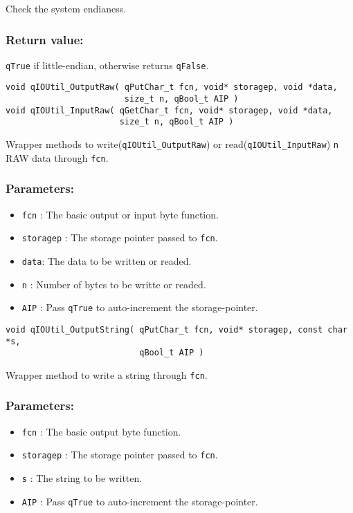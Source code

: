 Check the system endianess. 

\subsubsection*{Return value:}
\lstinline{qTrue} if little-endian, otherwise returns \lstinline{qFalse}.

\noindent\hrulefill

\begin{lstlisting}[style=CStyle]
void qIOUtil_OutputRaw( qPutChar_t fcn, void* storagep, void *data, 
                        size_t n, qBool_t AIP )
void qIOUtil_InputRaw( qGetChar_t fcn, void* storagep, void *data, 
                       size_t n, qBool_t AIP )
\end{lstlisting}

Wrapper methods to write(\lstinline{qIOUtil_OutputRaw})  or read(\lstinline{qIOUtil_InputRaw})  \lstinline{n} RAW data through \lstinline{fcn}.

\subsubsection*{Parameters:}
\begin{itemize}
    \item \lstinline{fcn} : The basic output or input byte function.
    \item \lstinline{storagep} : The storage pointer passed to \lstinline{fcn}.
    \item \lstinline{data}: The data to be written or readed.
    \item \lstinline{n} : Number of bytes to be writte or readed.
    \item \lstinline{AIP} : Pass \lstinline{qTrue} to auto-increment the storage-pointer.
\end{itemize}

\noindent\hrulefill

\begin{lstlisting}[style=CStyle]
void qIOUtil_OutputString( qPutChar_t fcn, void* storagep, const char *s, 
                           qBool_t AIP )
\end{lstlisting}

Wrapper method to write a string through \lstinline{fcn}. 

\subsubsection*{Parameters:}
\begin{itemize}
    \item \lstinline{fcn} : The basic output byte function.
    \item \lstinline{storagep} : The storage pointer passed to \lstinline{fcn}.
    \item \lstinline{s} : The string to be written.
    \item \lstinline{AIP} : Pass \lstinline{qTrue} to auto-increment the storage-pointer.
\end{itemize}

